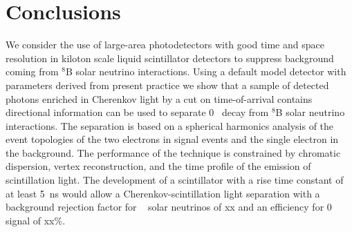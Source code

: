 \section{Conclusions}
\label{sec:conclusions}
We consider the use of large-area photodetectors with good time and
space resolution in kiloton scale liquid scintillator detectors to
suppress background coming from $^{8}$B solar neutrino
interactions. Using a default model detector with parameters derived
from present practice we show that a sample of detected photons
enriched in Cherenkov light by a cut on time-of-arrival contains
directional information can be used to separate 0{\nbb}~ decay from
$^{8}$B solar neutrino interactions. The separation is based on a
spherical harmonics analysis of the event topologies of the
two electrons in signal events and the single electron in the
background. The performance of the technique is constrained by
chromatic dispersion, vertex reconstruction, and the time profile of
the emission of scintillation light. The development of a scintillator
with a rise time constant of at least 5~ns would allow a
Cherenkov-scintillation light separation with a background rejection
factor for \B~ solar neutrinos of xx and an efficiency for 0\nbb~ signal
of xx\%.


